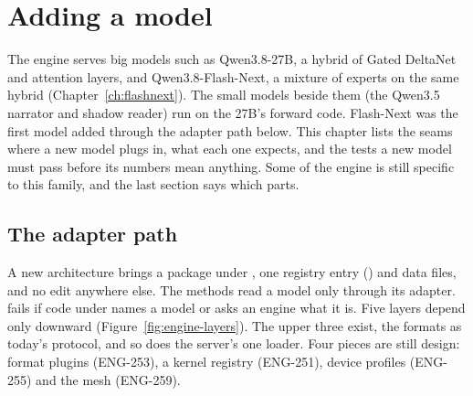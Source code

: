 \chapter{Adding a model}\label{ch:adding-model}

The engine serves big models such as Qwen3.8-27B, a hybrid of Gated DeltaNet and attention layers, and Qwen3.8-Flash-Next, a mixture of experts on the same hybrid (Chapter~\ref{ch:flashnext}). The small models beside them (the Qwen3.5 narrator and shadow reader) run on the 27B's forward code. Flash-Next was the first model added through the adapter path below. This chapter lists the seams where a new model plugs in, what each one expects, and the tests a new model must pass before its numbers mean anything. Some of the engine is still specific to this family, and the last section says which parts.

\section{The adapter path}\label{sec:adapter-path}

A new architecture brings a package under , one registry entry () and data files, and no edit anywhere else. The methods read a model only through its adapter.  fails if code under  names a model or asks an engine what it is. Five layers depend only downward (Figure~\ref{fig:engine-layers}). The upper three exist, the formats as today's  protocol, and so does the server's one loader. Four pieces are still design: format plugins (ENG-253), a kernel registry (ENG-251), device profiles (ENG-255) and the mesh (ENG-259).


